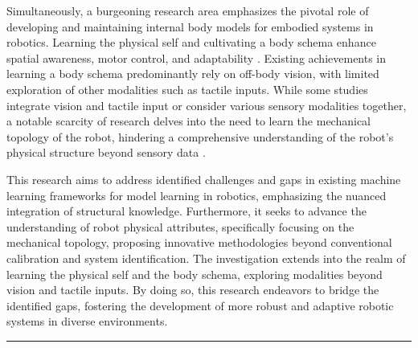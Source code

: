 \documentclass[12pt, a4paper]{article}
\begin{document}
Simultaneously, a burgeoning research area emphasizes the pivotal role of developing and maintaining internal body models for embodied systems in robotics. Learning the physical self and cultivating a body schema enhance spatial awareness, motor control, and adaptability \cite{Nguyen2021Sensorimotorrepresentationlearning,Hoffmann2010Bodyschemarobotics}. Existing achievements in learning a body schema predominantly rely on off-body vision, with limited exploration of other modalities such as tactile inputs. While some studies integrate vision and tactile input or consider various sensory modalities together, a notable scarcity of research delves into the need to learn the mechanical topology of the robot, hindering a comprehensive understanding of the robot's physical structure beyond sensory data \cite{Hersch2008Onlinelearningbody,MartinezCantin2010Bodyschemaacquisition,Hart2011roboticmodelecological,Lipson2019Taskagnosticself,Chen2022Fullybodyvisual,Li2015Towardsbodyschema,Zenha2018Incrementaladaptationrobot,Gama2021Goaldirectedtactile,Fuke2007BodyImageConstructed,Malinovska2022connectionistmodelassociating,Nguyen2019Reachingdevelopmentvisuo,Pugach2019BrainInspiredCoding,Lanillos2016Yieldingselfperception,Bongard2006Automatedsynthesisbody,Bongard2006Resilientmachinescontinuous}.

This research aims to address identified challenges and gaps in existing machine learning frameworks for model learning in robotics, emphasizing the nuanced integration of structural knowledge. Furthermore, it seeks to advance the understanding of robot physical attributes, specifically focusing on the mechanical topology, proposing innovative methodologies beyond conventional calibration and system identification. The investigation extends into the realm of learning the physical self and the body schema, exploring modalities beyond vision and tactile inputs. By doing so, this research endeavors to bridge the identified gaps, fostering the development of more robust and adaptive robotic systems in diverse environments.

\hrule
\end{document}
